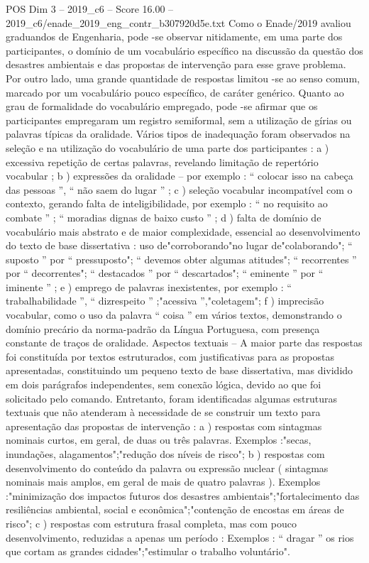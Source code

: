 \begin{textsample}{POS Dim 3 – 2019\_c6 – Score 16.00 – 2019\_c6/enade\_2019\_eng\_contr\_b307920d5e.txt}
Como o Enade/2019 avaliou graduandos de Engenharia, pode -se observar nitidamente, em uma parte dos participantes, o domínio de um vocabulário específico na discussão da questão dos desastres ambientais e das propostas de intervenção para esse grave problema.
Por outro lado, uma grande quantidade de respostas limitou -se ao senso comum, marcado por um vocabulário pouco específico, de caráter genérico.
Quanto ao grau de formalidade do vocabulário empregado, pode -se afirmar que os participantes empregaram um registro semiformal, sem a utilização de gírias ou palavras típicas da oralidade.
Vários tipos de inadequação foram observados na seleção e na utilização do vocabulário de uma parte dos participantes : a ) excessiva repetição de certas palavras, revelando limitação de repertório vocabular ; b ) expressões da oralidade – por exemplo : “ colocar isso na cabeça das pessoas ”, “ não saem do lugar ” ; c ) seleção vocabular incompatível com o contexto, gerando falta de inteligibilidade, por exemplo : “ no requisito ao combate ” ; “ moradias dignas de baixo custo ” ; d ) falta de domínio de vocabulário mais abstrato e de maior complexidade, essencial ao desenvolvimento do texto de base dissertativa : uso de"corroborando"no lugar de"colaborando"; “ suposto ” por “ pressuposto"; “ devemos obter algumas atitudes"; “ recorrentes ” por “ decorrentes"; “ destacados ” por “ descartados"; “ eminente ” por “ iminente ” ; e ) emprego de palavras inexistentes, por exemplo : “ trabalhabilidade ”, “ dizrespeito ” ;"acessiva ”,"coletagem"; f ) imprecisão vocabular, como o uso da palavra “ coisa ” em vários textos, demonstrando o domínio precário da norma-padrão da Língua Portuguesa, com presença constante de traços de oralidade.
Aspectos textuais – A maior parte das respostas foi constituída por textos estruturados, com justificativas para as propostas apresentadas, constituindo um pequeno texto de base dissertativa, mas dividido em dois parágrafos independentes, sem conexão lógica, devido ao que foi solicitado pelo comando.
Entretanto, foram identificadas algumas estruturas textuais que não atenderam à necessidade de se construir um texto para apresentação das propostas de intervenção : a ) respostas com sintagmas nominais curtos, em geral, de duas ou três palavras.
Exemplos :"secas, inundações, alagamentos";"redução dos níveis de risco"; b ) respostas com desenvolvimento do conteúdo da palavra ou expressão nuclear ( sintagmas nominais mais amplos, em geral de mais de quatro palavras ).
Exemplos :"minimização dos impactos futuros dos desastres ambientais";"fortalecimento das resiliências ambiental, social e econômica";"contenção de encostas em áreas de risco"; c ) respostas com estrutura frasal completa, mas com pouco desenvolvimento, reduzidas a apenas um período : Exemplos : “ dragar ” os rios que cortam as grandes cidades";"estimular o trabalho voluntário".

\end{textsample}
